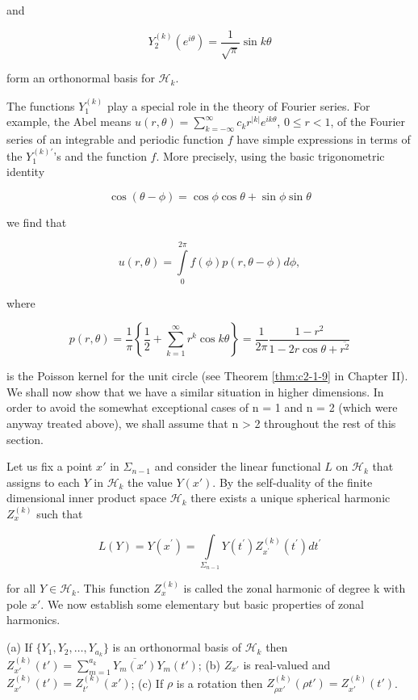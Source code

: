and

\[
Y_{2}^{(k)}(e^{i\theta})=\frac{1}{\sqrt{\pi}}\sin k\theta
\]

form an orthonormal basis for $\mathscr{H}_{k}$.

The functions $Y_1^{(k)}$ play a special role in the theory of Fourier series. For example, the Abel means $u(r, \theta) = \sum_{k=-\infty}^{\infty} c_k r^{|k|} e^{ik\theta}$, $0 \leq r < 1$, of the Fourier series of an integrable and periodic function $f$ have simple expressions in terms of the $Y_1^{(k)\prime}$'s and the function $f$. More precisely, using the basic trigonometric identity

\begin{equation}\label{eq:c4-2-6}
\cos\left(\theta-\phi\right)=\cos\phi\cos\theta+\sin\phi\sin\theta
\end{equation}

we find that

\[
u(r,\theta)=\int\limits_{0}^{2\pi}f(\phi)p(r,\theta-\phi)d\phi,
\]

where

\begin{equation}\label{eq:c4-2-7}
p(r,\theta)=\frac{1}{\pi}\left\{\frac{1}{2}+\sum_{k=1}^{\infty}r^{k}\cos k\theta\right\}=\frac{1}{2\pi}\frac{1-r^{2}}{1-2r\cos\theta+\overline{r^{2}}}
\end{equation}

is the Poisson kernel for the unit circle (see Theorem \ref{thm:c2-1-9} in Chapter II). We shall now show that we have a similar situation in higher dimensions. In order to avoid the somewhat exceptional cases of n = 1 and n = 2 (which were anyway treated above), we shall assume that n > 2 throughout the rest of this section.

Let us fix a point $x'$ in $\Sigma_{n-1}$ and consider the linear functional $L$ on $\mathcal{H}_k$ that assigns to each $Y$ in $\mathcal{H}_k$ the value $Y(x')$. By the self-duality of the finite dimensional inner product space $\mathcal{H}_k$ there exists a unique spherical harmonic $Z_x^{(k)}$ such that

\[
L(Y)=Y(x^{\prime})=\int\limits_{\Sigma_{n-1}}Y(t^{\prime})Z_{x^{\prime}}^{(k)}(t^{\prime})dt^{\prime}
\]

for all $Y \in \mathcal{H}_k$. This function $Z_x^{(k)}$ is called the zonal harmonic of degree k with pole $x'$. We now establish some elementary but basic properties of zonal harmonics.

\begin{lemma}
\label{lem:c4-2-8}
(a) If $\{Y_1, Y_2, \ldots, Y_{a_k}\}$ is an orthonormal basis of $\mathcal{H}_k$ then $Z_{x'}^{(k)}(t') = \sum_{m=1}^{a_k} \overline{Y_m(x')} Y_m(t')$;
(b) $Z_{x'}$ is real-valued and $Z_{x'}^{(k)}(t') = Z_{t'}^{(k)}(x')$;
(c) If $\rho$ is a rotation then $Z_{\rho x'}^{(k)}(\rho t') = Z_{x'}^{(k)}(t')$.
\end{lemma}

